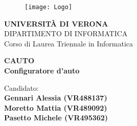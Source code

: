 \begin{titlepage}
    \begin{figure}[htb]
        \centering
        \texttt{[image: Logo]}
        \vspace{2mm}
    \end{figure}
    
    \begin{center}
        \LARGE{\bf UNIVERSITÀ DI VERONA}
        \vspace{2mm}
        \\ \large{DIPARTIMENTO DI INFORMATICA }
        \vspace{5mm}
        \\ \LARGE{Corso di Laurea Triennale in Informatica}
    \end{center}
    
    \vspace{15mm}
    \begin{center}
        {\LARGE{\bf CAUTO\\\vspace{5mm}Configuratore d'auto}}
    \end{center}
    \vspace{20mm}
    
    \begin{center}
        {\large{Candidato:\\}
            \large\bf{
                Gennari Alessia (VR488137)\\ 
                \vspace{1mm}
                Moretto Mattia (VR489092)\\ 
                \vspace{1mm}
                Pasetto Michele (VR495362)\\%
            }
        }
    \end{center}
    
    \vspace{\fill}
    
    \end{titlepage}